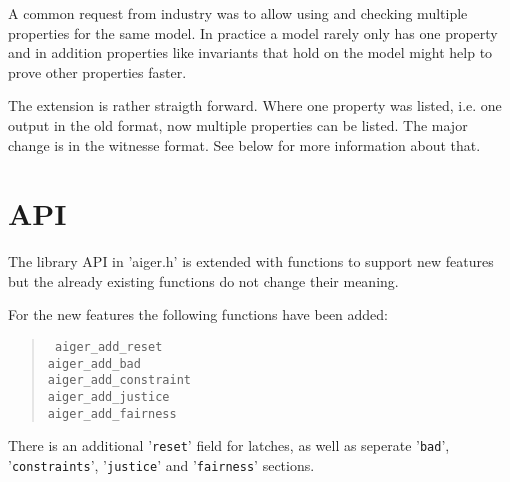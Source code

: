 \documentclass{llncs}
\begin{document}
A common request from industry was to allow using and checking multiple
properties for the same model.  In practice a model rarely only has one
property and in addition properties like invariants that hold on the model
might help to prove other properties faster.

The extension is rather straigth forward.  Where one property was listed,
i.e. one output in the old format, now multiple properties can be listed.
The major change is in the witnesse format.  See below for more information
about that.

\section{API}

The library API in 'aiger.h' is extended with functions to support new
features but the already existing functions do not change their meaning.

For the new features the following functions have been added:

\begin{quote}
\tt
  aiger_add_reset \\
  aiger_add_bad \\
  aiger_add_constraint \\
  aiger_add_justice \\
  aiger_add_fairness \\
\end{quote}

There is an additional '\texttt{reset}' field for latches, as well as 
seperate '\texttt{bad}', '\texttt{constraints}', '\texttt{justice}' and
'\texttt{fairness}' sections.
\end{document}
